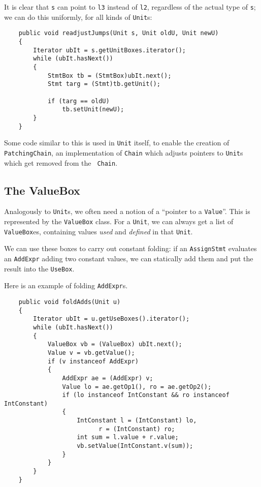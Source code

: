 \documentclass{article}
\begin{document}
It is clear that {\tt s} can point to {\tt l3}
instead of {\tt l2}, regardless of the actual type of {\tt s};
we can do this uniformly, for all kinds of {\tt Unit}s:
\begin{verbatim}
    public void readjustJumps(Unit s, Unit oldU, Unit newU)
    {
        Iterator ubIt = s.getUnitBoxes.iterator();
        while (ubIt.hasNext())
        {
            StmtBox tb = (StmtBox)ubIt.next();
            Stmt targ = (Stmt)tb.getUnit();

            if (targ == oldU)
                tb.setUnit(newU);
        }
    }
\end{verbatim}

Some code similar to this is used in {\tt Unit} itself, to enable the
creation of {\tt PatchingChain}, an implementation of {\tt Chain}
which adjusts pointers to {\tt Unit}s which get removed from the {\tt
Chain}.

\subsection{The ValueBox}

Analogously to {\tt Unit}s, we often need a notion of a ``pointer to a 
{\tt Value}''.  This is represented by the {\tt ValueBox} class.
For a {\tt Unit}, we can always get a list of {\tt ValueBox}es,
containing values {\em used} and {\em defined} in that {\tt Unit}.

We can use these boxes to carry out constant folding: if an {\tt AssignStmt}
evaluates an {\tt AddExpr} adding two constant values, we can statically
add them and put the result into the {\tt UseBox}.

Here is an example of folding {\tt AddExpr}s.

\begin{verbatim}
    public void foldAdds(Unit u)
    {
        Iterator ubIt = u.getUseBoxes().iterator();
        while (ubIt.hasNext())
        {
            ValueBox vb = (ValueBox) ubIt.next();
            Value v = vb.getValue();
            if (v instanceof AddExpr)
            {
                AddExpr ae = (AddExpr) v;
                Value lo = ae.getOp1(), ro = ae.getOp2();
                if (lo instanceof IntConstant && ro instanceof IntConstant)
                {
                    IntConstant l = (IntConstant) lo,
                          r = (IntConstant) ro;
                    int sum = l.value + r.value;
                    vb.setValue(IntConstant.v(sum));
                }
            }
        }
    }
\end{verbatim}
\end{document}
